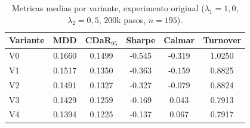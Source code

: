 \begin{table}[ht]
  \centering
  \caption{Metricas medias por variante, experimento original ($\lambda_1=1{,}0$, $\lambda_2=0{,}5$, 200k pasos, $n=195$).}
  \label{tab:per_variant_original}
  \begin{tabular}{lccccc}
    \toprule
    Variante & MDD & CDaR$_{95}$ & Sharpe & Calmar & Turnover \\
    \midrule
    V0 & 0.1660 & 0.1499 & -0.545 & -0.319 & 1.0250 \\
    V1 & 0.1517 & 0.1350 & -0.363 & -0.159 & 0.8825 \\
    V2 & 0.1491 & 0.1327 & -0.327 & -0.079 & 0.8824 \\
    V3 & 0.1429 & 0.1259 & -0.169 & 0.043 & 0.7913 \\
    V4 & 0.1394 & 0.1225 & -0.137 & 0.067 & 0.7917 \\
    \bottomrule
  \end{tabular}
\end{table}
